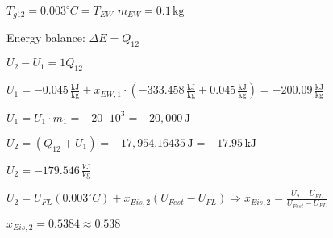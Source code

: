 \( T_{g12} = 0.003^\circ C = T_{EW} \)  
\( m_{EW} = 0.1 \, \text{kg} \)  

Energy balance:  
\( \Delta E = Q_{12} \)  

\( U_2 - U_1 = 1Q_{12} \)  

\( U_1 = -0.045 \, \frac{\text{kJ}}{\text{kg}} + x_{EW,1} \cdot (-333.458 \, \frac{\text{kJ}}{\text{kg}} + 0.045 \, \frac{\text{kJ}}{\text{kg}}) = -200.09 \, \frac{\text{kJ}}{\text{kg}} \)  

\( U_1 = U_1 \cdot m_1 = -20 \cdot 10^3 = -20,000 \, \text{J} \)  

\( U_2 = (Q_{12} + U_1) = -17,954.16435 \, \text{J} = -17.95 \, \text{kJ} \)  

\( U_2 = -179.546 \, \frac{\text{kJ}}{\text{kg}} \)  

\( U_2 = U_{FL} (0.003^\circ C) + x_{Eis,2} (U_{Fest} - U_{FL}) \Rightarrow x_{Eis,2} = \frac{U_2 - U_{FL}}{U_{Fest} - U_{FL}} \)  

\( x_{Eis,2} = 0.5384 \approx 0.538 \)